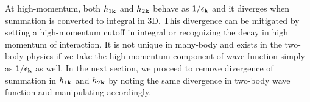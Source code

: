 At high-momentum, both $h_{1\mathbf{k}}$ and $h_{2\mathbf{k}}$ behave as $1/\epsilon_{\mathbf{k}}$ and it diverges when summation is converted to integral in 3D.  This divergence can be mitigated by setting a high-momentum cutoff in integral or recognizing the decay in high momentum of interaction.  It is not unique in many-body and exists in the two-body physics if we take the high-momentum component of wave function simply as $1/\epsilon_{\mathbf{k}}$ as well.  In the next section, we proceed to  remove divergence of summation in $h_{1\mathbf{k}}$ and $h_{2\mathbf{k}}$ by noting the same divergence in two-body wave function and manipulating accordingly. 
 
